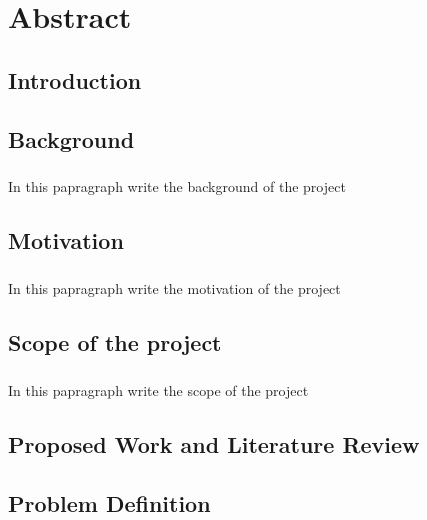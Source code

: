 \documentclass{book}
\begin{document}
	\chapter*{Abstract}
	
	\tableofcontents
	\listoffigures
	\listoftables
	\begin{doublespace} 
		\chapter{Introduction}
\end{doublespace}
\setcounter{page}{1}
\lhead{}
\chead{}
\rhead{\leftmark}
\section{Background}
\paragraph{}
In this papragraph write the background of the project

\section{Motivation}
\paragraph {}
In this papragraph write the motivation of the project

\section {Scope of the project}
\paragraph {}
In this papragraph write the scope of the project

\begin{doublespace} 
\chapter{Proposed Work and Literature Review}
\end{doublespace}



\section{Problem Definition}
\end{document}
